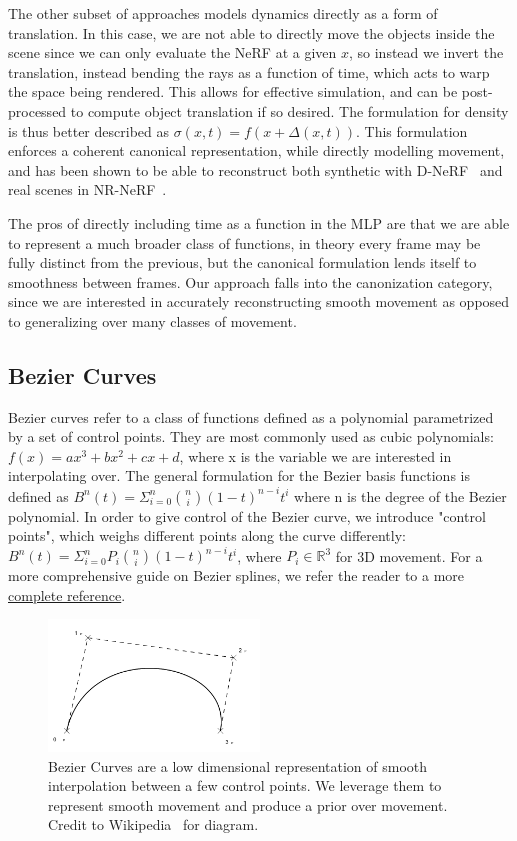 The other subset of approaches models dynamics directly as a form of translation. In this case, we are not able to directly move the objects inside the scene since we can only evaluate the NeRF at a given $x$, so instead we invert the translation, instead bending the rays as a function of time, which acts to warp the space being rendered. This allows for effective simulation, and can be post-processed to compute object translation if so desired. The formulation for density is thus better described as $\sigma(x,t)=f(x+\Delta(x,t))$. This formulation enforces a coherent canonical representation, while directly modelling movement, and has been shown to be able to reconstruct both synthetic with D-NeRF~\cite{pumarola2020dnerf} and real scenes in NR-NeRF~\cite{tretschk2021nonrigid}.

The pros of directly including time as a function in the MLP are that we are able to represent a much broader class of functions, in theory every frame may be fully distinct from the previous, but the canonical formulation lends itself to smoothness between frames. Our approach falls into the canonization category, since we are interested in accurately reconstructing smooth movement as opposed to generalizing over many classes of movement.

\subsection*{Bezier Curves}

Bezier curves refer to a class of functions defined as a polynomial parametrized by a set of
control points. They are most commonly used as cubic polynomials: $f(x) = ax^3 + bx^2 + cx + d$,
where x is the variable we are interested in interpolating over. The general formulation for
the Bezier basis functions is defined as $B^n(t) = \Sigma^n_{i=0}
{n \choose i} (1-t)^{n-i} t^i$ where n
is the degree of the Bezier polynomial. In order to give control of the Bezier curve, we
introduce "control points", which weighs different points along the curve differently:
$B^n(t) = \Sigma^n_{i=0} P_i {n \choose i} (1-t)^{n-i} t^i$, where $P_i\in\mathbb{R}^3$ for 3D
movement. For a more comprehensive guide on Bezier splines, we refer the reader to a more
\href{https://pomax.github.io/bezierinfo/index.html}{complete reference}.

\begin{figure}
    \centering
    \includegraphics[width=0.5\textwidth]{bezier_curve.png}
    \caption{
        Bezier Curves are a low dimensional representation of smooth interpolation between a few control points. We leverage them to represent smooth movement and produce a prior over movement. Credit to Wikipedia~\cite{bezier_diagram} for diagram.
    }
    \label{fig:my_label}
\end{figure}


